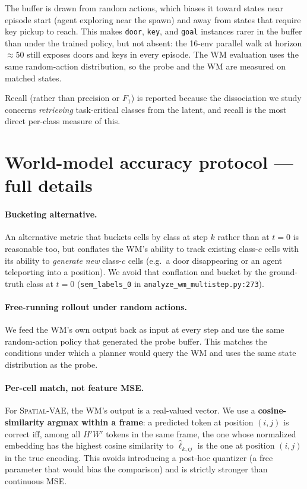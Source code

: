 \documentclass{article}
\newcommand{\encSpatialVAE}{\textsc{Spatial-VAE}}
\begin{document}
The buffer is drawn from random actions, which biases it toward states near episode start (agent exploring near the spawn) and away from states that require key pickup to reach. This makes \texttt{door}, \texttt{key}, and \texttt{goal} instances rarer in the buffer than under the trained policy, but not absent: the 16-env parallel walk at horizon $\approx 50$ still exposes doors and keys in every episode. The WM evaluation uses the same random-action distribution, so the probe and the WM are measured on matched states.

Recall (rather than precision or $F_1$) is reported because the dissociation we study concerns \emph{retrieving} task-critical classes from the latent, and recall is the most direct per-class measure of this.

\section{World-model accuracy protocol --- full details}\label{app:wm-protocol}

\paragraph{Bucketing alternative.}
An alternative metric that buckets cells by class at step $k$ rather than at $t{=}0$ is reasonable too, but conflates the WM's ability to track existing class-$c$ cells with its ability to \emph{generate new} class-$c$ cells (e.g.\ a door disappearing or an agent teleporting into a position). We avoid that conflation and bucket by the ground-truth class at $t{=}0$ (\texttt{sem\_labels\_0} in \texttt{analyze\_wm\_multistep.py:273}).

\paragraph{Free-running rollout under random actions.}
We feed the WM's own output back as input at every step and use the same random-action policy that generated the probe buffer. This matches the conditions under which a planner would query the WM and uses the same state distribution as the probe.

\paragraph{Per-cell match, not feature MSE.}
For \encSpatialVAE{}, the WM's output is a real-valued vector. We use a \textbf{cosine-similarity argmax within a frame}: a predicted token at position $(i,j)$ is correct iff, among all $H'W'$ tokens in the same frame, the one whose normalized embedding has the highest cosine similarity to $\hat\ell_{k, ij}$ is the one at position $(i, j)$ in the true encoding. This avoids introducing a post-hoc quantizer (a free parameter that would bias the comparison) and is strictly stronger than continuous MSE.
\end{document}
